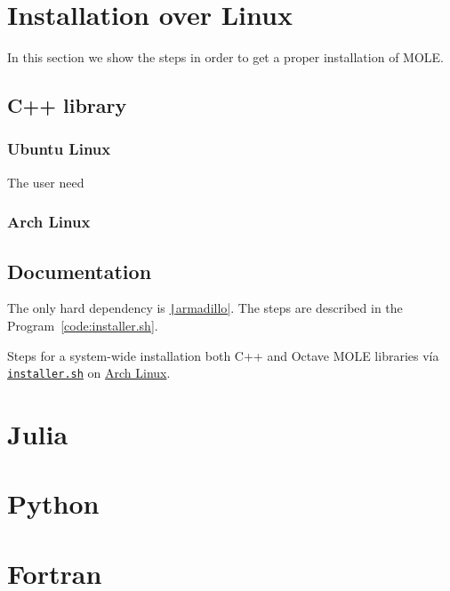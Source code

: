 \appendix

\chapter{Installation over Linux}

In this section we show the steps in order to get a proper installation of MOLE.

\section{C++ library}

\subsection{Ubuntu Linux}

The user need

\subsection{Arch Linux}

\section{Documentation}

The only hard dependency is
\href{https://arma.sourceforge.net/docs.html}{\texttt|armadillo|}.
The steps are described in the Program~\ref{code:installer.sh}.

\begin{listing}[ht!]
    \tiny
    \centering
    \caption{Steps for a system-wide installation both C++ and Octave
        MOLE libraries vía \href{https://raw.githubusercontent.com/carlosal1015/mole_examples/main/homework/installer.sh}{\texttt{installer.sh}} on
        \href{https://archlinux.org}{Arch Linux}.}
    \label{code:installer.sh}
\end{listing}

\chapter{Julia}

\chapter{Python}

\chapter{Fortran}

\nocite{*}
\printbibliography[title={References}]
